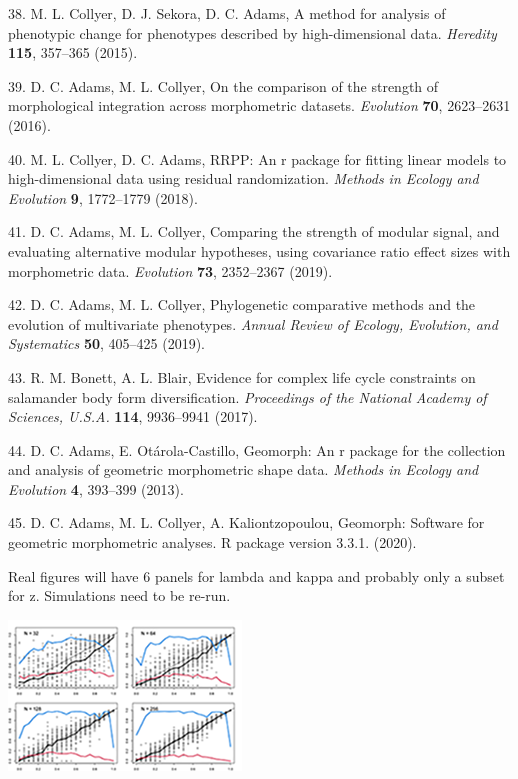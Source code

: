 \documentclass[
]{article}
\begin{document}
\leavevmode\hypertarget{ref-Collyer_et_al2015a}{}%
38. M. L. Collyer, D. J. Sekora, D. C. Adams, A method for analysis of
phenotypic change for phenotypes described by high-dimensional data.
\emph{Heredity} \textbf{115}, 357--365 (2015).

\leavevmode\hypertarget{ref-AdamsCollyer2016}{}%
39. D. C. Adams, M. L. Collyer, On the comparison of the strength of
morphological integration across morphometric datasets. \emph{Evolution}
\textbf{70}, 2623--2631 (2016).

\leavevmode\hypertarget{ref-CollyerAdams2018}{}%
40. M. L. Collyer, D. C. Adams, RRPP: An r package for fitting linear
models to high-dimensional data using residual randomization.
\emph{Methods in Ecology and Evolution} \textbf{9}, 1772--1779 (2018).

\leavevmode\hypertarget{ref-AdamsCollyer2019b}{}%
41. D. C. Adams, M. L. Collyer, Comparing the strength of modular
signal, and evaluating alternative modular hypotheses, using covariance
ratio effect sizes with morphometric data. \emph{Evolution} \textbf{73},
2352--2367 (2019).

\leavevmode\hypertarget{ref-AdamsCollyer2019}{}%
42. D. C. Adams, M. L. Collyer, Phylogenetic comparative methods and the
evolution of multivariate phenotypes. \emph{Annual Review of Ecology,
Evolution, and Systematics} \textbf{50}, 405--425 (2019).

\leavevmode\hypertarget{ref-Bonett2017}{}%
43. R. M. Bonett, A. L. Blair, Evidence for complex life cycle
constraints on salamander body form diversification. \emph{Proceedings
of the National Academy of Sciences, U.S.A.} \textbf{114}, 9936--9941
(2017).

\leavevmode\hypertarget{ref-AdamsOtarola2013}{}%
44. D. C. Adams, E. Otárola-Castillo, Geomorph: An r package for the
collection and analysis of geometric morphometric shape data.
\emph{Methods in Ecology and Evolution} \textbf{4}, 393--399 (2013).

\leavevmode\hypertarget{ref-AdamsGeomorph}{}%
45. D. C. Adams, M. L. Collyer, A. Kaliontzopoulou, Geomorph: Software
for geometric morphometric analyses. R package version 3.3.1. (2020).

\newpage

Real figures will have 6 panels for lambda and kappa and probably only a
subset for z. Simulations need to be re-run.

\includegraphics[width=0.95\linewidth]{new.fig.1.temp}
\end{document}
